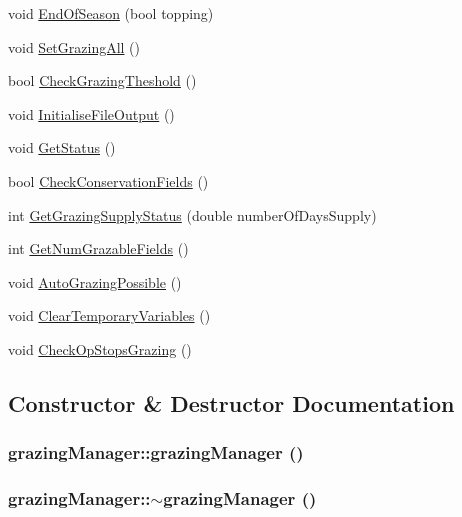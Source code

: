 \begin{DoxyCompactItemize}
\item 
void \hyperlink{classgrazing_manager_a6d936f90c10dfc4f5bf7e7eddc3b85c0}{EndOfSeason} (bool topping)
\item 
void \hyperlink{classgrazing_manager_a6f11fda1e9b60ffac195adb3d93d6ca7}{SetGrazingAll} ()
\item 
bool \hyperlink{classgrazing_manager_aa831a26148a1171fce3f1e2971135d34}{CheckGrazingTheshold} ()
\item 
void \hyperlink{classgrazing_manager_a2facc8dfbfbbcd8f9fec21fe5d58c942}{InitialiseFileOutput} ()
\item 
void \hyperlink{classgrazing_manager_ac5d9211b46dabde68fb3038bfad1752b}{GetStatus} ()
\item 
bool \hyperlink{classgrazing_manager_a7e94949ab9bfb77da28ac2c3dcd79aaa}{CheckConservationFields} ()
\item 
int \hyperlink{classgrazing_manager_a2e8c040172f02e13bf9642b493ea1ab0}{GetGrazingSupplyStatus} (double numberOfDaysSupply)
\item 
int \hyperlink{classgrazing_manager_abba248d53777abb444403613dccd77c3}{GetNumGrazableFields} ()
\item 
void \hyperlink{classgrazing_manager_a782edbd814727753f68ea5d041f79c9d}{AutoGrazingPossible} ()
\item 
void \hyperlink{classgrazing_manager_a6fc495736362d8f4b2da023fecae5259}{ClearTemporaryVariables} ()
\item 
void \hyperlink{classgrazing_manager_ad4339322398af753da757bcebc3a085c}{CheckOpStopsGrazing} ()
\end{DoxyCompactItemize}


\subsection{Constructor \& Destructor Documentation}
\hypertarget{classgrazing_manager_a278deab30e954617cdd90a482e309f3f}{
\subsubsection[{grazingManager}]{\setlength{\rightskip}{0pt plus 5cm}grazingManager::grazingManager ()}}
\label{classgrazing_manager_a278deab30e954617cdd90a482e309f3f}
\hypertarget{classgrazing_manager_ae9e0a96a199a9e571fed2f9728444885}{
\subsubsection[{$\sim$grazingManager}]{\setlength{\rightskip}{0pt plus 5cm}grazingManager::$\sim$grazingManager ()}}
\label{classgrazing_manager_ae9e0a96a199a9e571fed2f9728444885}



